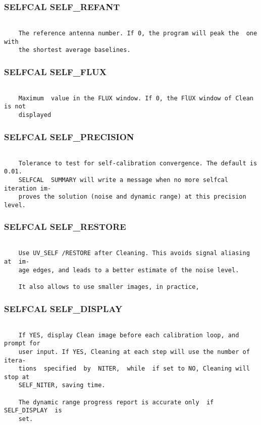 \subsubsection{SELFCAL SELF\_REFANT}
\begin{verbatim}

    The reference antenna number. If 0, the program will peak the  one  with
    the shortest average baselines.

\end{verbatim}
\subsubsection{SELFCAL SELF\_FLUX}
\begin{verbatim}

    Maximum  value in the FLUX window. If 0, the FlUX window of Clean is not
    displayed

\end{verbatim}
\subsubsection{SELFCAL SELF\_PRECISION}
\begin{verbatim}

    Tolerance to test for self-calibration convergence. The default is 0.01.
    SELFCAL  SUMMARY will write a message when no more selfcal iteration im-
    proves the solution (noise and dynamic range) at this precision level.

\end{verbatim}
\subsubsection{SELFCAL SELF\_RESTORE}
\begin{verbatim}

    Use UV_SELF /RESTORE after Cleaning. This avoids signal aliasing at  im-
    age edges, and leads to a better estimate of the noise level.

    It also allows to use smaller images, in practice,

\end{verbatim}
\subsubsection{SELFCAL SELF\_DISPLAY}
\begin{verbatim}

    If YES, display Clean image before each calibration loop, and prompt for
    user input. If YES, Cleaning at each step will use the number of  itera-
    tions  specified  by  NITER,  while  if set to NO, Cleaning will stop at
    SELF_NITER, saving time.

    The dynamic range progress report is accurate only  if  SELF_DISPLAY  is
    set.

\end{verbatim}
